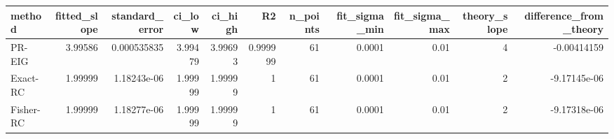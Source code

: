 \begin{tabular}{lrrrrrrrrrr}
\toprule
method & fitted_slope & standard_error & ci_low & ci_high & R2 & n_points & fit_sigma_min & fit_sigma_max & theory_slope & difference_from_theory \\
\midrule
PR-EIG & 3.99586 & 0.000535835 & 3.99479 & 3.99693 & 0.999999 & 61 & 0.0001 & 0.01 & 4 & -0.00414159 \\
Exact-RC & 1.99999 & 1.18243e-06 & 1.99999 & 1.99999 & 1 & 61 & 0.0001 & 0.01 & 2 & -9.17145e-06 \\
Fisher-RC & 1.99999 & 1.18277e-06 & 1.99999 & 1.99999 & 1 & 61 & 0.0001 & 0.01 & 2 & -9.17318e-06 \\
\bottomrule
\end{tabular}
